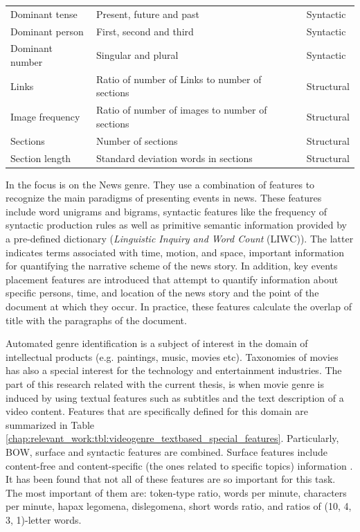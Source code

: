 \begin{table}[t]
\begin{tabular}{p{3cm}p{7cm}p{3cm}}
        Dominant tense & Present, future and past & Syntactic \\
        Dominant person & First, second and third & Syntactic \\
        Dominant number & Singular and plural & Syntactic \\
		Links & Ratio of number of Links to number of sections  & Structural \\
        Image frequency & Ratio of number of images to number of sections  & Structural \\
        Sections & Number of sections & Structural \\
        Section length & Standard deviation words in sections & Structural \\
		\hline
	\end{tabular}
\end{table}

In \parencite{dai2018fine} the focus is on the News genre. They use a combination of features to recognize the main paradigms of presenting events in news. These features include word unigrams and bigrams, syntactic features like the frequency of syntactic production rules as well as primitive semantic information provided by a pre-defined dictionary (\textit{Linguistic Inquiry and Word Count} (LIWC)). The latter indicates terms associated with time, motion, and space, important information for quantifying the narrative scheme of the news story. In addition, key events placement features are introduced that attempt to quantify information about specific persons, time, and location of the news story and the point of the document at which they occur. In practice, these features calculate the overlap of title with the paragraphs of the document.

Automated genre identification is a subject of interest in the domain of intellectual products (e.g. paintings, music, movies etc). Taxonomies of movies has also a special interest for the technology and entertainment industries. The part of this research related with the current thesis, is when movie genre is induced by using textual features such as subtitles and the text description of a video content. Features that are specifically defined for this domain are summarized in Table \ref{chap:relevant_work:tbl:videogenre_textbased_special_features}. Particularly, BOW, surface and syntactic features are combined. Surface features include content-free and content-specific (the ones related to specific topics) information \parencite{lee2017text}. It has been found that not all of these features are so important for this task. The most important of them are: token-type ratio, words per minute, characters per minute, hapax legomena, dislegomena, short words ratio, and ratios of (10, 4, 3, 1)-letter words. 

